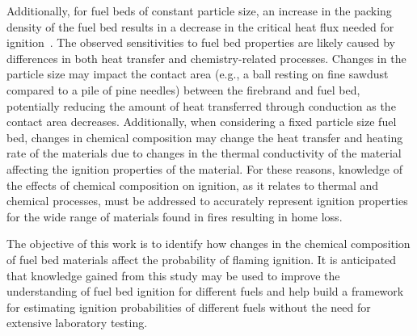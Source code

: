     Additionally, for fuel beds of constant particle size, an increase in the packing density of the fuel bed results in a decrease in the critical heat flux needed for ignition~\cite{Mindykowski2011, Hernandez2017, Rivera2020}. The observed sensitivities to fuel bed properties are likely caused by differences in both heat transfer and chemistry-related processes. Changes in the particle size may impact the contact area (e.g., a ball resting on fine sawdust compared to a pile of pine needles) between the firebrand and fuel bed, potentially reducing the amount of heat transferred through conduction as the contact area decreases. Additionally, when considering a fixed particle size fuel bed, changes in chemical composition may change the heat transfer and heating rate of the materials due to changes in the thermal conductivity of the material affecting the ignition properties of the material. For these reasons, knowledge of the effects of chemical composition on ignition, as it relates to thermal and chemical processes, must be addressed to accurately represent ignition properties for the wide range of materials found in fires resulting in home loss.
  
    The objective of this work is to identify how changes in the chemical composition of fuel bed materials affect the probability of flaming ignition. It is anticipated that knowledge gained from this study may be used to improve the understanding of fuel bed ignition for different fuels and help build a framework for estimating ignition probabilities of different fuels without the need for extensive laboratory testing.


